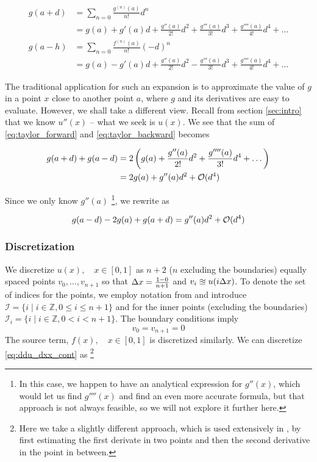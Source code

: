 \documentclass[a4paper]{article}
\begin{document}
\begin{align}
    g(a+d)
    &= \sum_{n=0} \frac{g^{(n)}(a)}{n!} d^n \nonumber \\
    &= g(a) + g'(a) d + \frac{g''(a)}{2!} d^2 + \frac{g'''(a)}{3!} d^3
            + \frac{g''''(a)}{4!} d^4 + \dots \label{eq:taylor_forward}\\
    g(a-h)
    &= \sum_{n=0} \frac{f^{(n)}(a)}{n!} (-d)^n \nonumber \\
    &= g(a) - g'(a) d + \frac{g''(a)}{2!} d^2 - \frac{g'''(a)}{3!} d^3
            + \frac{g''''(a)}{4!} d^4 + \dots \label{eq:taylor_backward}
\end{align}

The traditional application for such an expansion is to approximate the value of $g$ in a point $x$ close to another point $a$, where $g$ and its derivatives are easy to evaluate. However, we shall take a different view. Recall from section \ref{sec:intro} that we know $u''(x)$ -- what we seek is $u(x)$. We see that the sum of \eqref{eq:taylor_forward} and \eqref{eq:taylor_backward} becomes

\begin{align}
    g(a+d) + g(a-d)
        &= 2\left( g(a) + \frac{g''(a)}{2!} d^2 + \frac{g''''(a)}{3!} d^4 + \dots \right) \\
        &= 2g(a) + g''(a) d^2 + {\mathcal{O}}(d^4)
\end{align}

Since we only know $g''(a)$ \footnote{In this case, we happen to have an analytical expression for $g''(x)$, which would let us find $g''''(x)$ and find an even more accurate formula, but that approach is not always feasible, so we will not explore it further here.}, we rewrite as

\begin{equation}
     g(a-d) - 2g(a) + g(a+d) = g''(a)d^2 + {\mathcal{O}}(d^4)
\end{equation}

\subsubsection{Discretization}
We discretize $u(x), \quad x \in [0, 1]$ as $n+2$ ($n$ excluding the boundaries) equally spaced points $v_0, \dots, v_{n+1}$ so that ${\Delta x} = \frac{1 - 0}{n+1}$ and $v_i \approxeq u(i {\Delta x})$. To denote the set of indices for the points, we employ notation from \cite{hpl_fdm} and introduce $\mathcal{I} = \{ i \mid i \in \mathbb{Z}, 0 \leq i \leq n + 1\}$ and for the inner points (excluding the boundaries) $\mathcal{I}_i = \{ i \mid i \in \mathbb{Z}, 0 < i < n + 1\}$.
The boundary conditions imply
\begin{equation}
v_0 = v_{n+1} = 0
\label{eq:boundaries_disc}
\end{equation}
The source term, $f(x), \quad x \in [0, 1]$ is discretized similarly. We can discretize \eqref{eq:ddu_dxx_cont} as
\footnote{Here we take a slightly different approach, which is used extensively in \cite{hpl_fdm}, by first estimating the first derivate in two points and then the second derivative in the point in between.}
\end{document}
